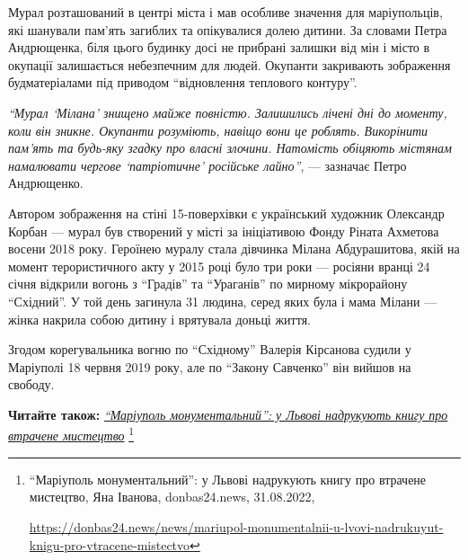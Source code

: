 Мурал розташований в центрі міста і мав особливе значення для маріупольців, які
шанували пам'ять загиблих та опікувалися долею дитини. За словами Петра
Андрющенка, біля цього будинку досі не прибрані залишки від мін і місто в
окупації залишається небезпечним для людей. Окупанти закривають зображення
будматеріалами під приводом \enquote{відновлення теплового контуру}.


\begin{leftbar}
\emph{\enquote{Мурал \enquote{Мілана} знищено майже повністю. Залишились лічені дні до моменту,
коли він зникне. Окупанти розуміють, навіщо вони це роблять. Викорінити пам'ять
та будь-яку згадку про власні злочини. Натомість обіцяють містянам намалювати
чергове \enquote{патріотичне} російське лайно}}, — зазначає Петро Андрющенко. 
\end{leftbar}





Автором зображення на стіні 15-поверхівки є український художник Олександр
Корбан — мурал був створений у місті за ініціативою Фонду Ріната Ахметова
восени 2018 року. Героїнею муралу стала дівчинка Мілана Абдурашитова, якій на
момент терористичного акту у 2015 році було три роки — росіяни вранці 24 січня
відкрили вогонь з \enquote{Градів} та \enquote{Ураганів} по мирному мікрорайону \enquote{Східний}. У
той день загинула 31 людина, серед яких була і мама Мілани — жінка накрила
собою дитину і врятувала доньці життя.

Згодом корегувальника вогню по \enquote{Східному} Валерія Кірсанова судили у Маріуполі
18 червня 2019 року, але по \enquote{Закону Савченко} він вийшов на свободу.

\textbf{Читайте також:} \href{https://donbas24.news/news/mariupol-monumentalnii-u-lvovi-nadrukuyut-knigu-pro-vtracene-mistectvo}{\emph{\enquote{Маріуполь монументальний}: у Львові надрукують книгу про втрачене мистецтво}}%
\footnote{\enquote{Маріуполь монументальний}: у Львові надрукують книгу про втрачене мистецтво, Яна Іванова, donbas24.news, 31.08.2022, \par%
\url{https://donbas24.news/news/mariupol-monumentalnii-u-lvovi-nadrukuyut-knigu-pro-vtracene-mistectvo}%
}

